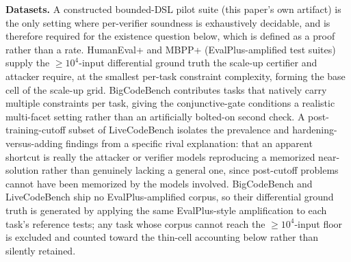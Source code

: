 \documentclass[11pt]{article}
\begin{document}
\textbf{Datasets.} A constructed bounded-DSL pilot suite (this paper's own artifact) is the only setting where per-verifier soundness is exhaustively decidable, and is therefore required for the existence question below, which is defined as a proof rather than a rate. HumanEval+ and MBPP+ (EvalPlus-amplified test suites) supply the $\geq 10^4$-input differential ground truth the scale-up certifier and attacker require, at the smallest per-task constraint complexity, forming the base cell of the scale-up grid. BigCodeBench contributes tasks that natively carry multiple constraints per task, giving the conjunctive-gate conditions a realistic multi-facet setting rather than an artificially bolted-on second check. A post-training-cutoff subset of LiveCodeBench isolates the prevalence and hardening-versus-adding findings from a specific rival explanation: that an apparent shortcut is really the attacker or verifier models reproducing a memorized near-solution rather than genuinely lacking a general one, since post-cutoff problems cannot have been memorized by the models involved. BigCodeBench and LiveCodeBench ship no EvalPlus-amplified corpus, so their differential ground truth is generated by applying the same EvalPlus-style amplification to each task's reference tests; any task whose corpus cannot reach the $\geq 10^4$-input floor is excluded and counted toward the thin-cell accounting below rather than silently retained.
\end{document}
